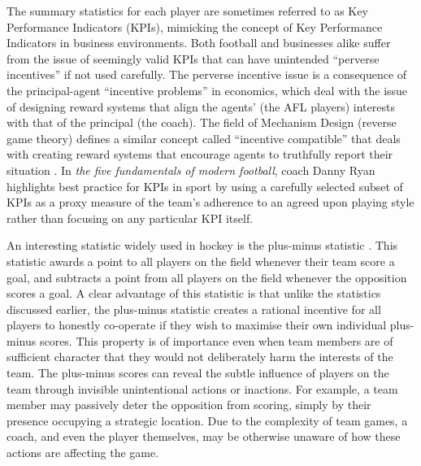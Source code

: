 
The summary statistics for each player are sometimes referred to as Key
Performance Indicators (KPIs), mimicking the concept of Key Performance
Indicators in business environments. Both football and businesses alike
suffer from the issue of seemingly valid KPIs that can have unintended
``perverse incentives'' \cite{parmenter_key_2010} if not used
carefully. The perverse incentive issue is a consequence of the
principal-agent ``incentive problems''
\cite{sappington_incentives_1991} in economics, which deal with the
issue of designing reward systems that align the agents' (the AFL
players) interests with that of the principal (the coach). The field of
Mechanism Design (reverse game theory) defines a similar concept called
``incentive compatible'' that deals with creating reward systems that
encourage agents to truthfully report their situation
\cite{Varian2008}. In \emph{the five fundamentals of modern
football}, coach Danny Ryan highlights best practice for KPIs in sport
by using a carefully selected subset of KPIs as a proxy measure of the
team's adherence to an agreed upon playing style \cite{Ryan2011}
rather than focusing on any particular KPI itself.

An interesting statistic widely used in hockey is the plus-minus statistic \cite{Karminsky2016}.
This statistic awards a point to all players on the field whenever their
team score a goal, and subtracts a point from all players on the field
whenever the opposition scores a goal. A clear advantage of this
statistic is that unlike the statistics discussed earlier, the
plus-minus statistic creates a rational incentive for all players to
honestly co-operate if they wish to maximise their own individual
plus-minus scores. This property is of importance even when team members
are of sufficient character that they would not deliberately harm the
interests of the team. The plus-minus scores can reveal the subtle
influence of players on the team through invisible unintentional actions
or inactions. For example, a team member may passively deter the
opposition from scoring, simply by their presence occupying a strategic
location. Due to the complexity of team games, a coach, and even the
player themselves, may be otherwise unaware of how these actions are
affecting the game.


